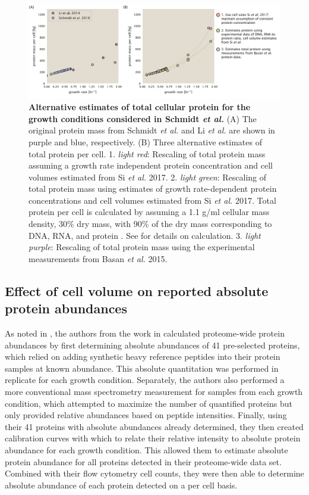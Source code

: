 \begin{figure}
		\centering
    \includegraphics[width=1\textwidth]{SI_figs/figA7_schmidt_protein_corrections.pdf}
  \caption{{\bf Alternative estimates of total cellular protein for the growth conditions
    considered in Schmidt \textit{et al.}} (A) The original protein mass from
    Schmidt \textit{et al.} and Li \textit{et al.} are shown in purple and blue,
    respectively. (B) Three alternative estimates of total protein per cell.
		1.  \textit{light red}: Rescaling of total protein mass assuming a
    growth rate independent protein concentration and cell volumes estimated
    from Si \textit{et al.} 2017. 2. \textit{light green}:  Rescaling of total protein
    mass using estimates of growth rate-dependent protein concentrations and
    cell volumes estimated from Si \textit{et al.} 2017. Total protein per cell
		is calculated by assuming a 1.1 g/ml cellular mass density, 30\% dry mass, with
		90\% of the dry mass corresponding to DNA, RNA, and protein \citep{basan2015}. See
		 for details on calculation. 3. \textit{light purple}: Rescaling
    of total protein mass using the experimental measurements from Basan
    \textit{et al.} 2015.
	 	}
  \label{fig:schmidt_adjustment_summary}
\end{figure}

\subsection{Effect of cell volume on reported absolute protein abundances}
As noted in ,
the authors from the work in \cite{schmidt2016} calculated proteome-wide protein abundances by first determining
absolute abundances of 41 pre-selected proteins, which relied on adding
synthetic heavy reference peptides into their protein samples at known abundance.  This
absolute quantitation was performed in replicate for each growth condition.
Separately, the authors also performed a more conventional mass spectrometry
measurement for samples from each growth condition, which attempted to maximize
the number of quantified proteins but only provided relative abundances based on
peptide intensities. Finally, using their 41 proteins with absolute abundances
already determined, they then created calibration curves with which to relate
their relative intensity to absolute protein abundance for each growth
condition.  This allowed them to estimate absolute protein abundance for all
proteins detected in their proteome-wide data set. Combined with their flow
cytometry cell counts, they were then able to determine absolute abundance of
each protein detected on a per cell basis.

